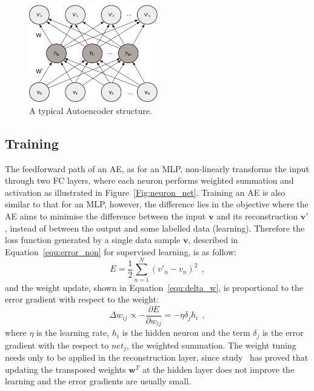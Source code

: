 \begin{figure}
	\centering
	\includegraphics[width=0.5\textwidth]{pics_sdlm/AE.pdf}
	\caption{A typical Autoencoder structure.}
	\label{fig:AE}
\end{figure}


\subsection{Training}
The feedforward path of an AE, as for an MLP, non-linearly transforms the input through two FC layers, where each neuron performs weighted summation and activation as illustrated in Figure~\ref{Fig:neuron_net}.
Training an AE is also similar to that for an MLP, however, the difference lies in the objective where the AE aims to minimise the difference between the input $\mathbf{v}$ and its reconstruction $\mathbf{v'}$, instead of between the output and some labelled data (\DIFdelbegin {}\DIFdelend \DIFaddbegin {}\DIFaddend learning).
Therefore the loss function generated by a single data sample $\mathbf{v}$, described in Equation~\ref{equ:error_non} for supervised learning, is as follow:
\begin{equation}
E = \frac{1}{2}\sum_{n=1}^N (v'_{n}-v_{n})^{2}~~,
\end{equation}
and the weight update, shown in Equation~\ref{equ:delta_w}, is proportional to the error gradient with respect to the weight:
\begin{equation}
\Delta w_{ij} \propto -\frac{\partial E}{\partial w_{ij}} = -\eta \delta_j h_i~~,
\end{equation}
where $\eta$ is the learning rate, $h_i$ is the hidden neuron and the term $\delta_j$ is the error gradient with the respect to $net_j$, the weighted summation.
The weight tuning needs only to be applied in the reconstruction layer, since study~\citep{xu1993least} has proved that updating the transposed weights $\mathbf{w}^T$ at the hidden layer does not improve the learning and the error gradients are usually small.
